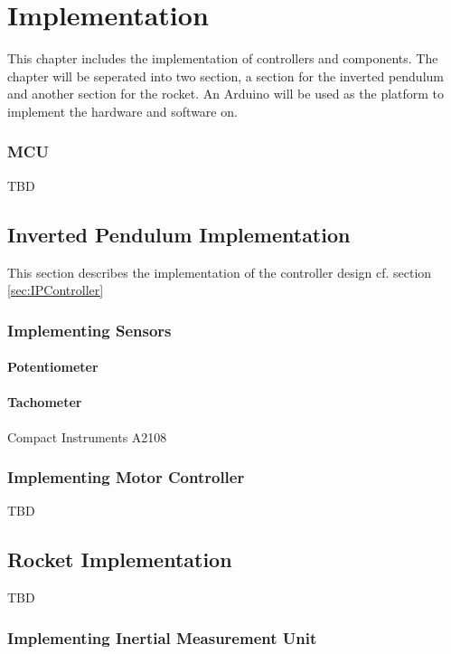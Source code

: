\chapter{Implementation}
This chapter includes the implementation of controllers and components. The chapter will be seperated into two section, a section for the inverted pendulum and another section for the rocket. An Arduino will be used as the platform to implement the hardware and software on.    


\subsection{MCU}\label{sec:MCU}
TBD


\section{Inverted Pendulum Implementation}
This section describes the implementation of the controller design cf. section \ref{sec:IPController}

\subsection{Implementing Sensors}

\subsubsection*{Potentiometer}

\subsubsection*{Tachometer}
Compact Instruments A2108


\subsection{Implementing Motor Controller}
TBD


\section{Rocket Implementation}
TBD

\subsection{Implementing Inertial Measurement Unit}